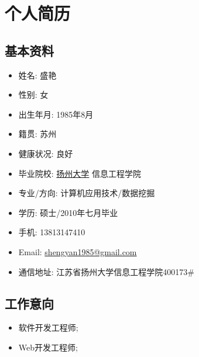 \documentclass[a4paper,10pt,english]{manual}
\begin{document}


\chapter{个人简历}


\section{基本资料}
  	

\begin{itemize}
\item {} 
姓名: 盛艳

\item {} 
性别: 女

\item {} 
出生年月: 1985年8月

\item {} 
籍贯: 苏州

\item {} 
健康状况: 良好

\item {} 
毕业院校: \href{http://www.yzu.edu.cn}{扬州大学} 信息工程学院

\item {} 
专业/方向: 计算机应用技术/数据挖掘

\item {} 
学历: 硕士/2010年七月毕业

\item {} 
手机: 13813147410

\item {} 
Email: \href{mailto:shengyan1985@gmail.com}{shengyan1985@gmail.com}

\item {} 
通信地址: 江苏省扬州大学信息工程学院400173\#

\end{itemize}

\section{工作意向}
\begin{itemize}
\item {} 
软件开发工程师;

\item {} 
Web开发工程师;


\end{itemize}
\end{document}
